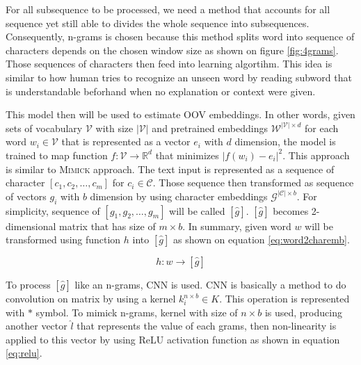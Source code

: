         For all subsequence to be processed, we need a method that
        accounts for all sequence yet still able to divides the whole
        sequence into subsequences. Consequently, n-grams is chosen
        because this method splits word into sequence of characters
        depends on the chosen window size as shown on figure
        \ref{fig:4grams}. Those sequences of characters then feed into
        learning algortihm. This idea is similar to how human tries to
        recognize an unseen word by reading subword that is
        understandable beforhand when no explanation or context were
        given. 

        This model then will be used to estimate OOV embeddings. In
        other words, given sets of vocabulary $\mathcal{V}$ with size
        $\vert\mathcal{V}\vert$ and pretrained embeddings
        $\mathcal{W}^{\vert\mathcal{V}\vert \times d}$ for each word
        $w_{i} \in \mathcal{V}$ that is represented as a vector $e_i$
        with $d$ dimension, the model is trained to map function
        $f:\mathcal{V} \rightarrow \mathbb{R}^d$ that minimizes $\vert
        f(w_i) - e_i
        \vert^{2}$. This approach is similar to \textsc{Mimick}
        \cite{mimicking2017Pinter} approach. The text input is
        represented as a sequence of character $[c_1, c_2, \dots,
        c_m]$ for $c_i \in \mathcal{C}$. Those sequence then
        transformed as sequence of vectors $g_i$ with $b$ dimension by
        using character embeddings $\mathcal{G}^{\vert \mathcal{C}
        \vert \times b}$. For simplicity, sequence of $[g_1, g_2,
        \dots, g_m]$ will be called $[\hat{g}]$. $[\hat{g}]$ becomes
        2-dimensional matrix that has size of $m \times b$. In
        summary, given word $w$ will be transformed using function $h$
        into $[\hat{g}]$ as shown on equation \ref{eq:word2charemb}.

        \begin{equation}
            \label{eq:word2charemb}
            h: w \rightarrow [\hat{g}]
        \end{equation}

        To process $[\hat{g}]$ like an n-grams, CNN is used. CNN is
        basically a method to do convolution on matrix by using a
        kernel $k_i^{n \times b} \in K$. This operation is represented
        with $*$ symbol. To mimick n-grams, kernel with size of $n
        \times b$ is used, producing another vector $\hat{l}$ that
        represents the value of each grams, then non-linearity is
        applied to this vector by using ReLU activation function as
        shown in equation \ref{eq:relu}.

